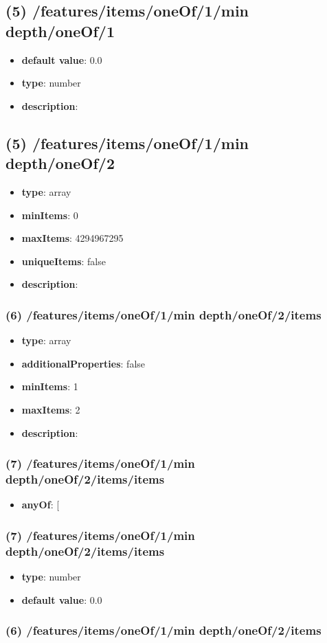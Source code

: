 \subsection{(5) /features/items/oneOf/1/min depth/oneOf/1}
\begin{itemize}[leftmargin=5em]\item {\bf default value}: 0.0
\item {\bf type}: number
\item {\bf description}: 
\end{itemize}\subsection{(5) /features/items/oneOf/1/min depth/oneOf/2}
\begin{itemize}[leftmargin=5em]\item {\bf type}: array
\item {\bf minItems}: 0
\item {\bf maxItems}: 4294967295
\item {\bf uniqueItems}: false
\item {\bf description}: 
\end{itemize}\subsubsection{(6) /features/items/oneOf/1/min depth/oneOf/2/items}
\begin{itemize}[leftmargin=6em]\item {\bf type}: array
\item {\bf additionalProperties}: false
\item {\bf minItems}: 1
\item {\bf maxItems}: 2
\item {\bf description}: 
\end{itemize}\subsubsection{(7) /features/items/oneOf/1/min depth/oneOf/2/items/items}
\begin{itemize}[leftmargin=7em]\item {\bf anyOf}: [\end{itemize}\subsubsection{(7) /features/items/oneOf/1/min depth/oneOf/2/items/items}
\begin{itemize}[leftmargin=7em]\item {\bf type}: number\item {\bf default value}: 0.0
\end{itemize}\subsubsection{(6) /features/items/oneOf/1/min depth/oneOf/2/items}
